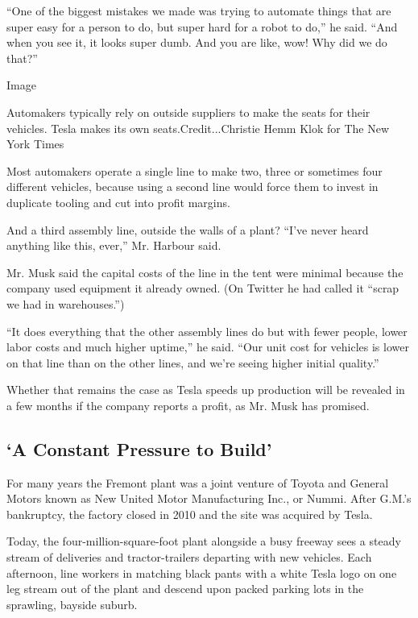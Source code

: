 ``One of the biggest mistakes we made was trying to automate things that
are super easy for a person to do, but super hard for a robot to do,''
he said. ``And when you see it, it looks super dumb. And you are like,
wow! Why did we do that?''

Image

Automakers typically rely on outside suppliers to make the seats for
their vehicles. Tesla makes its own seats.Credit...Christie Hemm Klok
for The New York Times

Most automakers operate a single line to make two, three or sometimes
four different vehicles, because using a second line would force them to
invest in duplicate tooling and cut into profit margins.

And a third assembly line, outside the walls of a plant? ``I've never
heard anything like this, ever,'' Mr. Harbour said.

Mr. Musk said the capital costs of the line in the tent were minimal
because the company used equipment it already owned. (On Twitter he had
called it ``scrap we had in warehouses.'')

``It does everything that the other assembly lines do but with fewer
people, lower labor costs and much higher uptime,'' he said. ``Our unit
cost for vehicles is lower on that line than on the other lines, and
we're seeing higher initial quality.''

Whether that remains the case as Tesla speeds up production will be
revealed in a few months if the company reports a profit, as Mr. Musk
has promised.

\hypertarget{a-constant-pressure-to-build}{%
\subsection{`A Constant Pressure to
Build'}\label{a-constant-pressure-to-build}}

For many years the Fremont plant was a joint venture of Toyota and
General Motors known as New United Motor Manufacturing Inc., or Nummi.
After G.M.'s bankruptcy, the factory closed in 2010 and the site was
acquired by Tesla.

Today, the four-million-square-foot plant alongside a busy freeway sees
a steady stream of deliveries and tractor-trailers departing with new
vehicles. Each afternoon, line workers in matching black pants with a
white Tesla logo on one leg stream out of the plant and descend upon
packed parking lots in the sprawling, bayside suburb.

